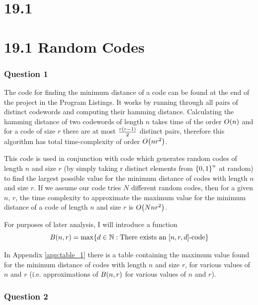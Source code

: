 \documentclass[11pt]{article} %
\let\originalleft\left
\let\originalright\right
\renewcommand{\left}{\mathopen{}\mathclose\bgroup\originalleft}
\renewcommand{\right}{\aftergroup\egroup\originalright}
\begin{document}
\section*{19.1}
\vspace*{6cm}

\section*{19.1 Random Codes}

\subsubsection*{Question 1}

The code for finding the minimum distance of a code can be found at the end of the project in the Program Listings. It works by running through all pairs of distinct codewords and computing their hamming distance. Calculating the hamming distance of two codewords of length $n$ takes time of the order $O\left(n\right)$ and for a code of size $r$ there are at most $\frac{r\left(r-1\right)}{2}$ distinct pairs, therefore this algorithm has total time-complexity of order $O\left(nr^2\right)$.

This code is used in conjunction with code which generates random codes of length $n$ and size $r$ (by simply taking r distinct elements from $\left\{0, 1\right\}^n$ at random) to find the largest possible value for the minimum distance of codes with length $n$ and size $r$. If we assume our code tries $N$ different random codes, then for a given $n$, $r$, the time complexity to approximate the maximum value for the minimum distance of a code of length $n$ and size $r$ is $O\left(Nnr^2\right)$.

For purposes of later analysis, I will introduce a function
\begin{equation*}
	B\left(n, r\right) = \max\left\{d \in \mathbb{N} : \text{There exists an } \left[n, r, d\right] \text{-code} \right\}
\end{equation*}

In Appendix \ref{app:table_1} there is a table containing the maximum value found for the minimum distance of codes with length $n$ and size $r$, for various values of $n$ and $r$ (i.e. approximations of $B\left(n, r\right)$ for various values of $n$ and $r$).


\subsubsection*{Question 2}
\end{document}
